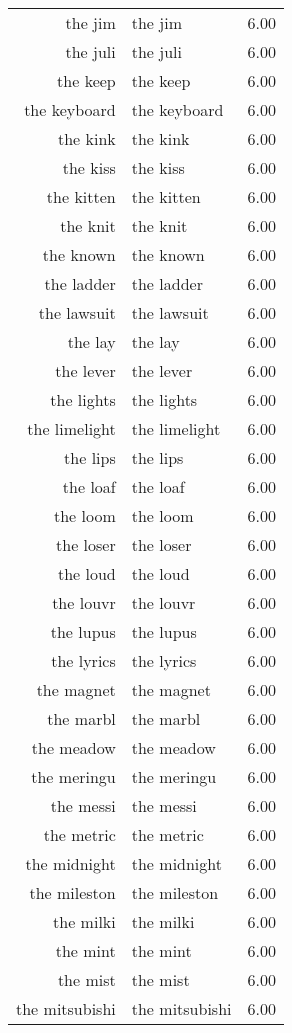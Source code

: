 \begin{table}[ht]
\begin{tabular}{rlr}
  the jim & the jim & 6.00 \\ 
  the juli & the juli & 6.00 \\ 
  the keep & the keep & 6.00 \\ 
  the keyboard & the keyboard & 6.00 \\ 
  the kink & the kink & 6.00 \\ 
  the kiss & the kiss & 6.00 \\ 
  the kitten & the kitten & 6.00 \\ 
  the knit & the knit & 6.00 \\ 
  the known & the known & 6.00 \\ 
  the ladder & the ladder & 6.00 \\ 
  the lawsuit & the lawsuit & 6.00 \\ 
  the lay & the lay & 6.00 \\ 
  the lever & the lever & 6.00 \\ 
  the lights & the lights & 6.00 \\ 
  the limelight & the limelight & 6.00 \\ 
  the lips & the lips & 6.00 \\ 
  the loaf & the loaf & 6.00 \\ 
  the loom & the loom & 6.00 \\ 
  the loser & the loser & 6.00 \\ 
  the loud & the loud & 6.00 \\ 
  the louvr & the louvr & 6.00 \\ 
  the lupus & the lupus & 6.00 \\ 
  the lyrics & the lyrics & 6.00 \\ 
  the magnet & the magnet & 6.00 \\ 
  the marbl & the marbl & 6.00 \\ 
  the meadow & the meadow & 6.00 \\ 
  the meringu & the meringu & 6.00 \\ 
  the messi & the messi & 6.00 \\ 
  the metric & the metric & 6.00 \\ 
  the midnight & the midnight & 6.00 \\ 
  the mileston & the mileston & 6.00 \\ 
  the milki & the milki & 6.00 \\ 
  the mint & the mint & 6.00 \\ 
  the mist & the mist & 6.00 \\ 
  the mitsubishi & the mitsubishi & 6.00 \\ 

\end{tabular}
\end{table}
